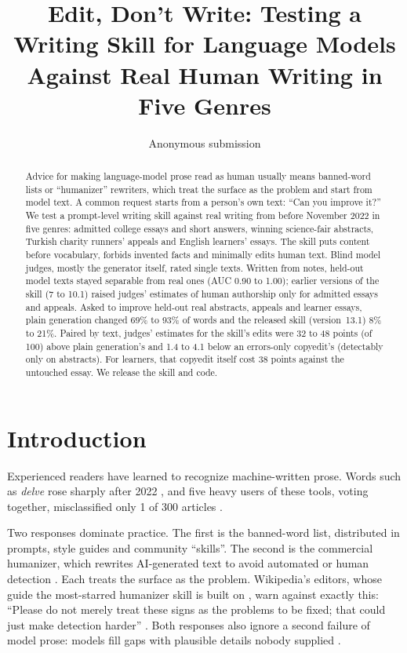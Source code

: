 \documentclass[11pt]{article}
\title{Edit, Don't Write: Testing a Writing Skill for Language Models\\Against Real Human Writing in Five Genres}
\author{Anonymous submission}
\newcommand{\shipver}{13.1}
\begin{document}
\maketitle

\begin{abstract}
Advice for making language-model prose read as human usually means banned-word lists or ``humanizer'' rewriters, which treat the surface as the problem and start from model text. A common request starts from a person's own text: ``Can you improve it?'' We test a prompt-level writing skill against real writing from before November 2022 in five genres: admitted college essays and short answers, winning science-fair abstracts, Turkish charity runners' appeals and English learners' essays. The skill puts content before vocabulary, forbids invented facts and minimally edits human text. Blind model judges, mostly the generator itself, rated single texts. Written from notes, held-out model texts stayed separable from real ones (AUC 0.90 to 1.00); earlier versions of the skill (7 to 10.1) raised judges' estimates of human authorship only for admitted essays and appeals. Asked to improve held-out real abstracts, appeals and learner essays, plain generation changed 69\% to 93\% of words and the released skill (version~\shipver{}) 8\% to 21\%. Paired by text, judges' estimates for the skill's edits were 32 to 48 points (of 100) above plain generation's and 1.4 to 4.1 below an errors-only copyedit's (detectably only on abstracts). For learners, that copyedit itself cost 38 points against the untouched essay. We release the skill and code.
\end{abstract}

\section{Introduction}

Experienced readers have learned to recognize machine-written prose. Words such as \emph{delve} rose sharply after 2022 \citep{kobak2025delving,liang2024monitoring}, and five heavy users of these tools, voting together, misclassified only 1 of 300 articles \citep{russell2025people}.

Two responses dominate practice. The first is the banned-word list, distributed in prompts, style guides and community ``skills''. The second is the commercial humanizer, which rewrites AI-generated text to avoid automated or human detection \citep{roe2026dramaturgies}. Each treats the surface as the problem. Wikipedia's editors, whose guide the most-starred humanizer skill is built on \citep{chen2026humanizer}, warn against exactly this: ``Please do not merely treat these signs as the problems to be fixed; that could just make detection harder'' \citep{wikipedia2026signs}. Both responses also ignore a second failure of model prose: models fill gaps with plausible details nobody supplied \citep{ji2023hallucination}.
\end{document}
